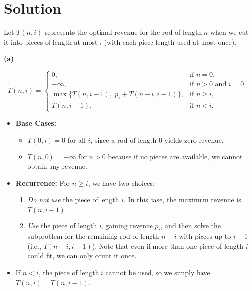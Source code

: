\documentclass[11pt]{article}
\begin{document}
    \section*{Solution}
        Let \(T(n,i)\) represents the optimal revenue for the rod of length \(n\) when we cut it into pieces of length at most \(i\) (with each piece length used at most once).
        
        \textbf{(a)}
    
        \[
        T(n,i) =
        \begin{cases}
        0, & \text{if } n = 0,\\[1mm]
        -\infty, & \text{if } n > 0 \text{ and } i = 0,\\[1mm]
        \max\Big\{ T(n, i-1),\; p_i + T(n-i, i-1) \Big\}, & \text{if } n \ge i,\\[1mm]
        T(n, i-1), & \text{if } n < i.
        \end{cases}
        \]
        
        \begin{itemize}
            \item \textbf{Base Cases:}
            \begin{itemize}
                \item \(T(0,i) = 0\) for all \(i\), since a rod of length 0 yields zero revenue.
                \item \(T(n,0) = -\infty\) for \(n > 0\) because if no pieces are available, we cannot obtain any revenue.
            \end{itemize}
            \item \textbf{Recurrence:} For \(n \ge i\), we have two choices:
            \begin{enumerate}
                \item \emph{Do not use} the piece of length \(i\). In this case, the maximum revenue is \(T(n, i-1)\).
                \item \emph{Use} the piece of length \(i\), gaining revenue \(p_i\), and then solve the subproblem for the remaining rod of length \(n-i\) with pieces up to \(i-1\) (i.e., \(T(n-i, i-1)\)). Note that even if more than one piece of length \(i\) could fit, we can only count it once.
            \end{enumerate}
            \item If \(n < i\), the piece of length \(i\) cannot be used, so we simply have \(T(n,i) = T(n,i-1)\).
        \end{itemize}
        
\end{document}

